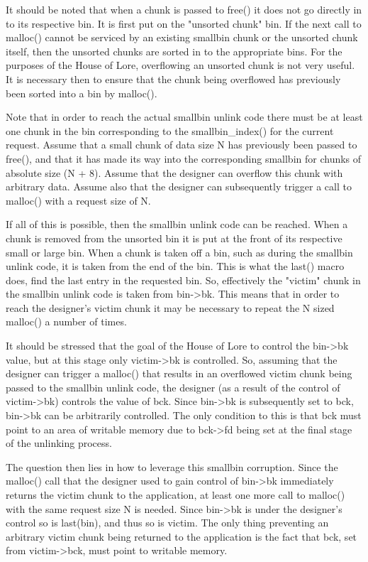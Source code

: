 \documentclass[12pt]{article}
\begin{document}
It should be noted that when a chunk is passed to free() it does
not go directly in to its respective bin. It is first put on the
"unsorted chunk" bin. If the next call to malloc() cannot be
serviced by an existing smallbin chunk or the unsorted chunk
itself, then the unsorted chunks are sorted in to the appropriate
bins. For the purposes of the House of Lore, overflowing an
unsorted chunk is not very useful. It is necessary then to ensure
that the chunk being overflowed has previously been sorted into a
bin by malloc().
\newline


Note that in order to reach the actual smallbin unlink code there
must be at least one chunk in the bin corresponding to the
smallbin_index() for the current request. Assume that a small chunk
of data size N has previously been passed to free(), and that it
has made its way into the corresponding smallbin for chunks of
absolute size (N + 8). Assume that the designer can overflow this
chunk with arbitrary data. Assume also that the designer can
subsequently trigger a call to malloc() with a request size of N.
\newline


If all of this is possible, then the smallbin unlink code can be
reached. When a chunk is removed from the unsorted bin it is put at
the front of its respective small or large bin. When a chunk is
taken off a bin, such as during the smallbin unlink code, it is
taken from the end of the bin. This is what the last() macro does,
find the last entry in the requested bin. So, effectively the
"victim" chunk in the smallbin unlink code is taken from bin->bk.
This means that in order to reach the designer's victim chunk it
may be necessary to repeat the N sized malloc() a number of times.
\newline


It should be stressed that the goal of the House of Lore to control
the bin->bk value, but at this stage only victim->bk is controlled.
So, assuming that the designer can trigger a malloc() that results
in an overflowed victim chunk being passed to the smallbin unlink
code, the designer (as a result of the control of victim->bk)
controls the value of bck. Since bin->bk is subsequently set to
bck, bin->bk can be arbitrarily controlled. The only condition to
this is that bck must point to an area of writable memory due to
bck->fd being set at the final stage of the unlinking process.
\newline


The question then lies in how to leverage this smallbin corruption.
Since the malloc() call that the designer used to gain control of
bin->bk immediately returns the victim chunk to the application, at
least one more call to malloc() with the same request size N is
needed. Since bin->bk is under the designer's control so is
last(bin), and thus so is victim. The only thing preventing an
arbitrary victim chunk being returned to the application is the
fact that bck, set from victim->bck, must point to writable memory.
\newline
\end{document}
